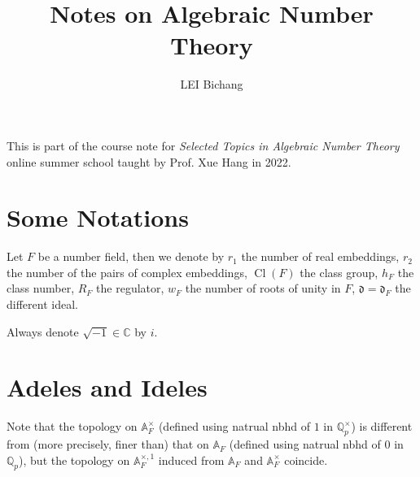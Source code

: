 \documentclass{article}
\title{Notes on Algebraic Number Theory}
\author{LEI Bichang}
\date{}
\theoremstyle{definition}
\theoremstyle{remark}
\newcommand{\C}{\mathbb{C}}
\newcommand{\Q}{\mathbb{Q}}
\newcommand{\adele}[1]{\mathbb{A}_{#1}}
\newcommand{\idele}[1]{\mathbb{A}_{#1}^{\times}}
\newcommand{\ideone}[1]{\mathbb{A}_{#1}^{\times, 1}}
\newcommand{\diff}{\mathfrak{d}}
\DeclareMathOperator{\cl}{Cl}
\begin{document}
\maketitle

This is part of the course note for \textit{Selected Topics in Algebraic Number Theory} online summer school taught by Prof. Xue Hang in 2022.

\section*{Some Notations}
\indent
Let $F$ be a number field, then we denote by $r_1$ the number of real embeddings, $r_2$ the number of the pairs of complex embeddings, $\cl(F)$ the class group, $h_F$ the class number, $R_F$ the regulator, $w_F$ the number of roots of unity in $F$, $\diff = \diff_F$ the different ideal.

Always denote $\sqrt{-1}\in \C$ by $i$.

\section{Adeles and Ideles}
Note that the topology on $\idele{F}$ (defined using natrual nbhd of $1$ in $\Q_p^\times$) is different from (more precisely, finer than) that on $\adele{F}$ (defined using natrual nbhd of $0$ in $\Q_p$),
but the topology on $\ideone{F}$ induced from $\adele{F}$ and $\idele{F}$ coincide.
\end{document}
